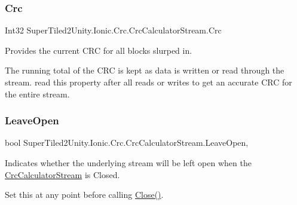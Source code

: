 \subsubsection{\texorpdfstring{Crc}{Crc}}
{\footnotesize\ttfamily Int32 Super\+Tiled2\+Unity.\+Ionic.\+Crc.\+Crc\+Calculator\+Stream.\+Crc\hspace{0.3cm}{\ttfamily [get]}}



Provides the current C\+RC for all blocks slurped in. 

The running total of the C\+RC is kept as data is written or read through the stream. read this property after all reads or writes to get an accurate C\+RC for the entire stream. \mbox{\label{class_super_tiled2_unity_1_1_ionic_1_1_crc_1_1_crc_calculator_stream_a795c3dfe1fc4761c1426191a66a3bb44}} 
\subsubsection{\texorpdfstring{Leave\+Open}{LeaveOpen}}
{\footnotesize\ttfamily bool Super\+Tiled2\+Unity.\+Ionic.\+Crc.\+Crc\+Calculator\+Stream.\+Leave\+Open\hspace{0.3cm}{\ttfamily [get]}, {\ttfamily [set]}}



Indicates whether the underlying stream will be left open when the {\ttfamily \mbox{\hyperlink{class_super_tiled2_unity_1_1_ionic_1_1_crc_1_1_crc_calculator_stream}{Crc\+Calculator\+Stream}}} is Closed. 

Set this at any point before calling \mbox{\hyperlink{class_super_tiled2_unity_1_1_ionic_1_1_crc_1_1_crc_calculator_stream_af4509c6b2480109b3b52f3881b5a8f5f}{Close()}}. \mbox{\label{class_super_tiled2_unity_1_1_ionic_1_1_crc_1_1_crc_calculator_stream_ad743ed8196bc2eda561d7afb0f6adb60}} 

